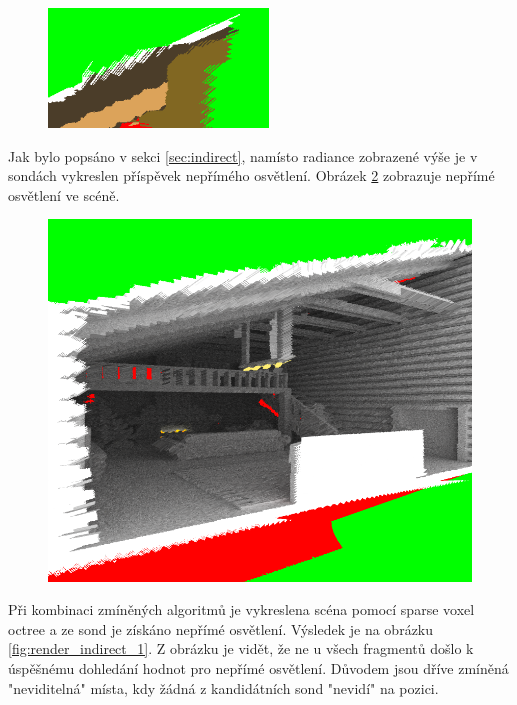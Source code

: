\begin{figure}[H]
	\centering
	\captionsetup{justification=centering}
	\includegraphics[scale=2.5]{images/probes_inaccuracy.png}
	\label{fig:probes_inaccuracy}
\end{figure}

Jak bylo popsáno v sekci \ref{sec:indirect}, namísto radiance zobrazené výše je v sondách vykreslen příspěvek nepřímého osvětlení. Obrázek \ref{fig:probes_indirect_scene} zobrazuje nepřímé osvětlení ve scéně.

\begin{figure}[H]
	\centering
	\captionsetup{justification=centering}
	\includegraphics[scale=1]{images/probe_indirect_render.png}
	\label{fig:probes_indirect_scene}
\end{figure}

Při kombinaci zmíněných algoritmů je vykreslena scéna pomocí sparse voxel octree a ze sond je získáno nepřímé osvětlení. Výsledek je na obrázku \ref{fig:render_indirect_1}. Z obrázku je vidět, že ne u všech fragmentů došlo k úspěšnému dohledání hodnot pro nepřímé osvětlení. Důvodem jsou dříve zmíněná "neviditelná" místa, kdy žádná z kandidátních sond "nevidí" na pozici.

